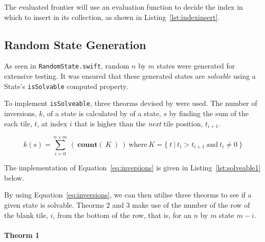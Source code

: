 The evaluated frontier will use an evaluation function to decide the index
in which to insert in its collection, as shown in Listing~\ref{lst:indexinsert}.



\subsection{Random State Generation}
\label{sub:random state generation}

As seen in \texttt{RandomState.swift}, random $n$ by $m$ states were
generated for extensive testing. It was ensured that these generated states are
\emph{solvable} using a State's \texttt{isSolvable} computed property.

To implement \texttt{isSolveable}, three theorms devised by
\citep{gong2000} were used. The number of inversions, $k$, of a state is
calculated by of a state, $s$ by finding the sum of the each tile, $t$, at index
$i$ that is higher than the \emph{next} tile position, $t_{i+1}$.

\begin{equation}\label{eq:inversions}
  k(s) = \sum_{i=0}^{n \times m} \ ( \
    \mathbf{ count } ( \ K \ )
  \ ) \ \text{where} \ K = \{ \ t \ | \ t_{i} > t_{i+1} \ \text{and} \ t_{i} \neq 0 \ \}
\end{equation}

The implementation of Equation~\ref{eq:inversions} is given in
Listing~\ref{lst:solveable1} below.



By using Equation~\ref{eq:inversions}, we can then utilise three theorms to see
if a given state is solvable. Theorms 2 and 3 make use of the number of
the row of the blank tile, $i$, from the bottom of the row, that is, for an $n$ by $m$
state $m - i$.

\paragraph{Theorm 1}
\label{par:Theorm 1}

